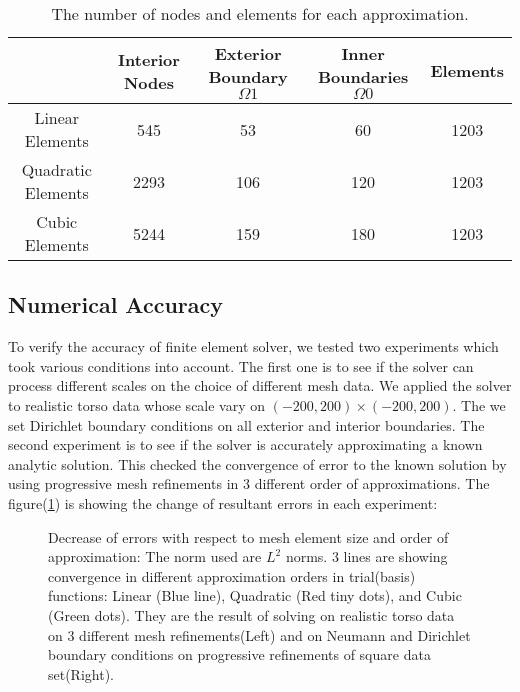 \begin{table}
\caption {\label{torsospec} The number of nodes and elements for
each approximation.}
\begin{tabular}{|c||c|c|c|c|} \hline
    &Interior Nodes & Exterior Boundary $\Omega{1}$ & Inner Boundaries $\Omega{0}$& Elements \\ \hline
    Linear Elements     &545    &   53 & 60 &1203 \\ \hline
    Quadratic Elements&2293 &   106 & 120 &1203 \\ \hline
    Cubic Elements&5244 &159 & 180 &1203    \\ \hline
\end{tabular}
\end{table}

\subsection{Numerical Accuracy}

To verify the accuracy of finite element solver, we tested two
experiments which took various conditions into account. The first
one is to see if the solver can process different scales on the
choice of different mesh data. We applied the solver to realistic
torso data whose scale vary on $(-200,200)\times(-200,200)$. The
we set Dirichlet boundary conditions on all exterior and interior
boundaries. The second experiment is to see if the solver is
accurately approximating a known analytic solution. This checked
the convergence of error to the known solution by using
progressive mesh refinements in 3 different order of
approximations. The figure(\ref{torsoerr}) is showing the change
of resultant errors in each experiment:
\begin{figure}[h]
\begin{center}
  \caption{\label{torsoerr} Decrease of errors with respect to mesh element size
  and order of approximation: The norm used are $L^{2}$ norms.
  3 lines are showing convergence in different approximation orders in trial(basis) functions:
  Linear (Blue line), Quadratic (Red tiny dots), and Cubic (Green dots). They are the result of
  solving on realistic torso data on 3 different mesh refinements(Left) and on Neumann and Dirichlet
  boundary conditions on progressive refinements of square data set(Right).}
\end{center}
\end{figure}

